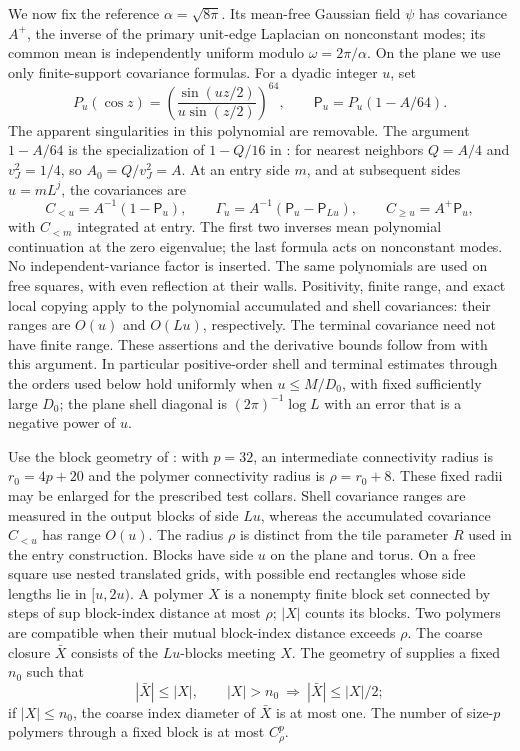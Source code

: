 We now fix the reference \(\alpha=\sqrt{8\pi}\).  Its mean-free
Gaussian field \(\psi\) has covariance \(A^+\), the inverse of
the primary unit-edge Laplacian on nonconstant modes; its common mean is independently
uniform modulo \(\omega=2\pi/\alpha\).  On the plane we use only
finite-support covariance formulas.  For a dyadic integer \(u\), set
\begin{equation}\label{inp:polynomials}
 P_u(\cos z)=\left(\frac{\sin(uz/2)}{u\sin(z/2)}\right)^{64},
 \qquad \mathsf P_u=P_u(1-A/64).
\end{equation}
The apparent singularities in this polynomial are removable.
The argument \(1-A/64\) is the specialization of
\(1-Q/16\) in \cite[Equation (9.11)]{B}:
for nearest neighbors \(Q=A/4\) and \(v_J^2=1/4\), so
\(A_0=Q/v_J^2=A\).  At an entry side \(m\), and at subsequent
sides \(u=mL^j\), the covariances are
\begin{equation}\label{inp:covariances}
 C_{<u}=A^{-1}(1-\mathsf P_u),\qquad
 \Gamma_u=A^{-1}(\mathsf P_u-\mathsf P_{Lu}),\qquad
 C_{\ge u}=A^+\mathsf P_u,
\end{equation}
with \(C_{<m}\) integrated at entry.  The first two inverses mean polynomial
continuation at the zero eigenvalue; the last formula acts on
nonconstant modes.  No independent-variance factor is inserted.
The same polynomials are used on free squares, with even reflection
at their walls.  Positivity, finite range, and exact local copying
apply to the polynomial accumulated and shell covariances: their
ranges are \(O(u)\) and \(O(Lu)\), respectively.  The terminal
covariance need not have finite range.  These assertions and the
derivative bounds follow from
\cite[Lemmas 8.1 and 4.1]{B} with this argument.
In particular positive-order shell and terminal estimates through
the orders used below hold uniformly when \(u\le M/D_0\), with
fixed sufficiently large \(D_0\); the plane shell diagonal is
\((2\pi)^{-1}\log L\) with an error that is a negative power of \(u\).

Use the block geometry of \cite[Lemma 4.3]{B}: with
\(p=32\), an intermediate connectivity radius is \(r_0=4p+20\)
and the polymer connectivity radius is \(\rho=r_0+8\).
These fixed radii may be enlarged for the prescribed test collars.
Shell covariance ranges are measured in the output blocks of side
\(Lu\), whereas the accumulated covariance \(C_{<u}\) has range
\(O(u)\).  The radius \(\rho\) is distinct from the tile
parameter \(R\) used in the entry construction.  Blocks have side
\(u\) on the plane and torus.  On a free square use nested translated
grids, with possible end rectangles whose side lengths lie in
\([u,2u)\).  A polymer \(X\) is a nonempty finite block set connected
by steps of sup block-index distance at most \(\rho\); \(|X|\)
counts its blocks.  Two polymers are compatible when their mutual
block-index distance exceeds \(\rho\).  The coarse closure
\(\bar X\) consists of the \(Lu\)-blocks meeting \(X\).
The geometry of \cite[Lemma 4.3]{B} supplies a fixed
\(n_0\) such that
\[
 |\bar X|\le |X|,\qquad
 |X|>n_0\ \Longrightarrow\ |\bar X|\le |X|/2;
\]
if \(|X|\le n_0\), the coarse index diameter of \(\bar X\) is
at most one.  The number of size-\(p\) polymers through a fixed
block is at most \(C_\rho^p\).

